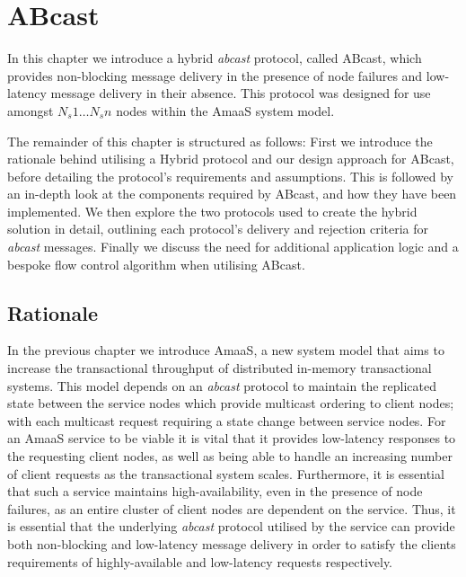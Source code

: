 \chapter{ABcast}\label{ch:abcast}

    \graphicspath{{Chapter4-ABcast/Figs/Vector/}{Chapter4-ABcast/Figs/}}

In this chapter we  introduce a hybrid \emph{abcast} protocol, called \textsf{ABcast}, which provides non-blocking message delivery in the presence of node failures and low-latency message delivery in their absence.  This protocol was designed for use amongst $N_s1 \ldots N_sn$ nodes within the \textsf{AmaaS} system model.  

The remainder of this chapter is structured as follows:  First we introduce the rationale behind utilising a Hybrid protocol and our design approach for \textsf{ABcast}, before detailing the protocol's requirements and assumptions.  This is followed by an in-depth look at the components required by \textsf{ABcast}, and how they have been implemented.  We then explore the two protocols used to create the hybrid solution in detail, outlining each protocol's delivery and rejection criteria for \emph{abcast} messages. Finally we discuss the need for additional application logic and a bespoke flow control algorithm when utilising \textsf{ABcast}.  

\section{Rationale}
    In the previous chapter we introduce \textsf{AmaaS}, a new system model that aims to increase the transactional throughput of distributed in-memory transactional systems.  This model depends on an \emph{abcast} protocol to maintain the replicated state between the service nodes which provide multicast ordering to client nodes; with each multicast request requiring a state change between service nodes.  For an \textsf{AmaaS} service to be viable it is vital that it provides low-latency responses to the requesting client nodes, as well as being able to handle an increasing number of client requests as the transactional system scales.  Furthermore, it is essential that such a service maintains high-availability, even in the presence of node failures, as an entire cluster of client nodes are dependent on the service.  Thus, it is essential that the underlying \emph{abcast} protocol utilised by the service can provide both non-blocking and low-latency message delivery in order to satisfy the clients requirements of highly-available and low-latency requests respectively.  
    
